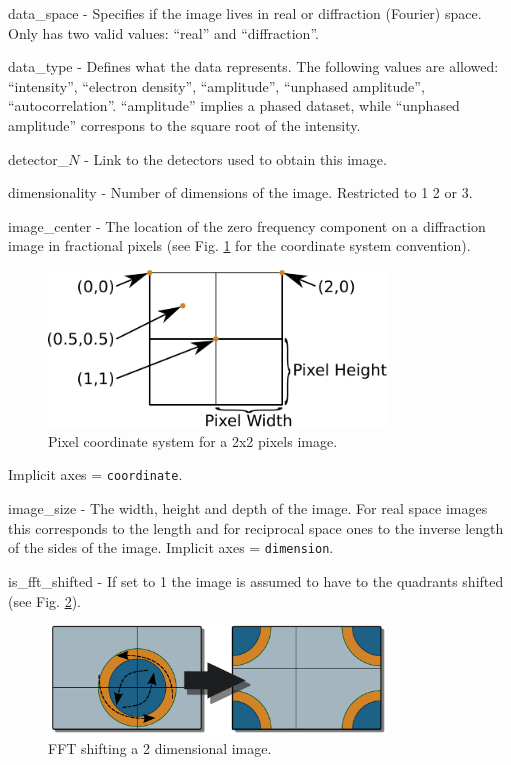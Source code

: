 \documentclass[usletter,11pt]{article}
\newcommand{\member}[2]
{ \noindent
{ \color{softBlue}  #1 - } #2
\vspace{0.2cm}
}
\begin{document}
\member{data\_space}{Specifies if the image lives in real or diffraction (Fourier)
 space. Only has two valid values: ``real'' and ``diffraction''. }

\member{data\_type}{Defines what the data represents. The following
  values are allowed: ``intensity'', ``electron density'',
  ``amplitude'', ``unphased amplitude'',
  ``autocorrelation''. ``amplitude'' implies a phased dataset, while
  ``unphased amplitude'' correspons to the square root of the intensity.}

\member{detector\_$N$}{Link to the detectors used to obtain this
image.}

\member{dimensionality}{Number of dimensions of the image. Restricted to 1 2 or 3.}

\member{image\_center}{The location of the zero frequency component on
 a diffraction image in fractional pixels  (see
 Fig. \ref{fig:pixel_coordinates} for the coordinate system convention).

\begin{figure}[h!]
\centering
\includegraphics[width=0.8\textwidth]{pixel_coordinates.pdf}
\caption{Pixel coordinate system for a 2x2 pixels image.}
\label{fig:pixel_coordinates}
\end{figure}

Implicit axes = {\tt coordinate}.
}


\member{image\_size}{The width, height and depth of the image. For
  real space images this corresponds to the length and for reciprocal
  space ones to the inverse length of the sides of the image. Implicit axes = {\tt dimension}.}

\member{is\_fft\_shifted}{If set to 1 the image is assumed to have to
  the quadrants shifted (see Fig. \ref{fig:fft_shift}).

\begin{figure}[h!]
\centering
\includegraphics[width=0.8\textwidth]{fft_shift.pdf}
\caption{FFT shifting a 2 dimensional image.}
\label{fig:fft_shift}
\end{figure}
}
\end{document}
